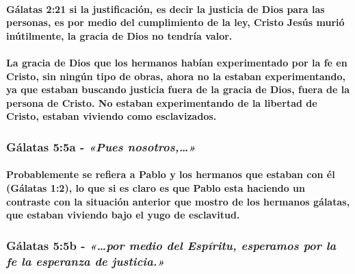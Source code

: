\documentclass[11a pt,twoside]{article}
\newcommand{\scripture}[1]{%
  {\fontsize{12pt}{16pt}\selectfont\ScriptureFont\itshape #1}%
}
\let\oldsubsubsection\subsubsection
\renewcommand{\subsubsection}{\needspace{4\baselineskip}\oldsubsubsection}
\let\oldparagraph\paragraph
\renewcommand{\paragraph}{\needspace{3\baselineskip}\oldparagraph}
\begin{document}
\paragraph{Gálatas 2:21 si la justificación, es decir la justicia de
Dios para las personas, es por medio del cumplimiento de la ley, Cristo
Jesús murió inútilmente, la gracia de Dios no tendría
valor.}\label{guxe1latas-221-si-la-justificaciuxf3n-es-decir-la-justicia-de-dios-para-las-personas-es-por-medio-del-cumplimiento-de-la-ley-cristo-jesuxfas-muriuxf3-inuxfatilmente-la-gracia-de-dios-no-tendruxeda-valor.}

\paragraph{La gracia de Dios que los hermanos habían experimentado por
la fe en Cristo, sin ningún tipo de obras, ahora no la estaban
experimentando, ya que estaban buscando justicia fuera de la gracia de
Dios, fuera de la persona de Cristo. No estaban experimentando de la
libertad de Cristo, estaban viviendo como
esclavizados.}\label{la-gracia-de-dios-que-los-hermanos-habuxedan-experimentado-por-la-fe-en-cristo-sin-ninguxfan-tipo-de-obras-ahora-no-la-estaban-experimentando-ya-que-estaban-buscando-justicia-fuera-de-la-gracia-de-dios-fuera-de-la-persona-de-cristo.-no-estaban-experimentando-de-la-libertad-de-cristo-estaban-viviendo-como-esclavizados.}

\subsubsection{\texorpdfstring{Gálatas 5:5a -
\scripture{«Pues nosotros,…»}}{Gálatas 5:5a - }}\label{guxe1latas-55a---pues-nosotros}

\paragraph{Probablemente se refiera a Pablo y los hermanos que estaban
con él (Gálatas 1:2), lo que si es claro es que Pablo esta haciendo un
contraste con la situación anterior que mostro de los hermanos gálatas,
que estaban viviendo bajo el yugo de
esclavitud.}\label{probablemente-se-refiera-a-pablo-y-los-hermanos-que-estaban-con-uxe9l-guxe1latas-12-lo-que-si-es-claro-es-que-pablo-esta-haciendo-un-contraste-con-la-situaciuxf3n-anterior-que-mostro-de-los-hermanos-guxe1latas-que-estaban-viviendo-bajo-el-yugo-de-esclavitud.}

\subsubsection{\texorpdfstring{Gálatas 5:5b -
\scripture{«…por medio del Espíritu, esperamos por la fe la esperanza de justicia.»}}{Gálatas 5:5b - }}\label{guxe1latas-55b---por-medio-del-espuxedritu-esperamos-por-la-fe-la-esperanza-de-justicia.}
\end{document}
